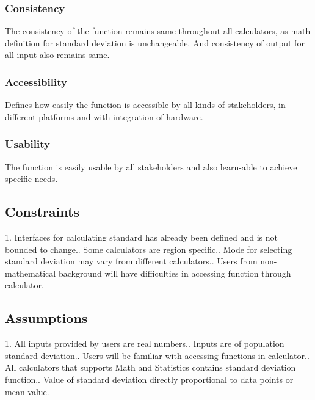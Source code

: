 \documentclass[a4paper,12pt]{article}
\begin{document}
\begin{titlepage}
\subsubsection{Consistency}
The consistency of the function remains same throughout all calculators, as math definition for standard deviation is unchangeable. And consistency of output for all input also remains same.
\subsubsection{Accessibility}
Defines how easily the function is accessible by all kinds of stakeholders, in different platforms and with integration of hardware.
\subsubsection{Usability}
The function is easily usable by all stakeholders and also learn-able to achieve specific needs.

\subsection{Constraints}
1.	Interfaces for calculating standard has already been defined and is not bounded to change..	Some calculators are region specific..  Mode for selecting standard deviation may vary from different calculators..  Users from non-mathematical background will have difficulties in accessing function through calculator.

\subsection{Assumptions}
1.	All inputs provided by users are real numbers..	Inputs are of population standard deviation..	Users will be familiar with accessing functions in calculator..	All calculators that supports Math and Statistics contains standard deviation function..	Value of standard deviation directly proportional to data points or mean value.


\end{titlepage}
\end{document}
